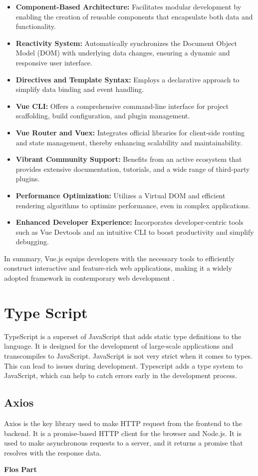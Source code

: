\begin{itemize}
    \item \textbf{Component-Based Architecture:} Facilitates modular development by enabling the creation of reusable components that encapsulate both data and functionality.
    \item \textbf{Reactivity System:} Automatically synchronizes the Document Object Model (DOM) with underlying data changes, ensuring a dynamic and responsive user interface.
    \item \textbf{Directives and Template Syntax:} Employs a declarative approach to simplify data binding and event handling.
    \item \textbf{Vue CLI:} Offers a comprehensive command-line interface for project scaffolding, build configuration, and plugin management.
    \item \textbf{Vue Router and Vuex:} Integrates official libraries for client-side routing and state management, thereby enhancing scalability and maintainability.
    \item \textbf{Vibrant Community Support:} Benefits from an active ecosystem that provides extensive documentation, tutorials, and a wide range of third-party plugins.
    \item \textbf{Performance Optimization:} Utilizes a Virtual DOM and efficient rendering algorithms to optimize performance, even in complex applications.
    \item \textbf{Enhanced Developer Experience:} Incorporates developer-centric tools such as Vue Devtools and an intuitive CLI to boost productivity and simplify debugging.
\end{itemize}

In summary, Vue.js equips developers with the necessary tools to efficiently construct interactive and feature-rich web applications, making it a widely adopted framework in contemporary web development 
\cite{VueJS-introduction}.

\section{Type Script}
TypeScript is a superset of JavaScript that adds static type definitions to the language. It is designed for the development of large-scale applications and transcompiles to JavaScript.
JavaScript is not very strict when it comes to types. This can lead to issues during development. Typescript adds a type system to JavaScript, which can help to catch errors early in the development process. 

\cite{Typescript_w3}
\subsection{Axios}
Axios is the key library used to make HTTP request from the frontend to the backend. It is a promise-based HTTP client for the browser and Node.js. It is used to make asynchronous requests to a server, and it returns a promise that resolves with the response data. 

\cite{axios_docs}

\textbf{Flos Part}
